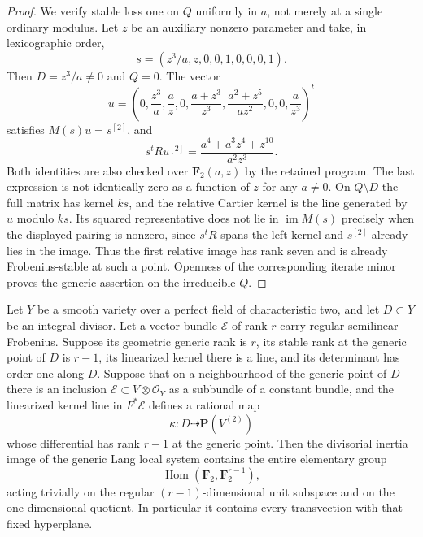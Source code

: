 \begin{proof}
We verify stable loss one on $Q$ uniformly in $a$, not merely at a
single ordinary modulus. Let $z$ be an auxiliary nonzero parameter
and take, in lexicographic order,
\[
             s=(z^3/a,z,0,0,1,0,0,0,1).
\]
Then $D=z^3/a\ne0$ and $Q=0$. The vector
\[
 u=\left(0,\frac{z^3}{a},\frac a z,0,
          \frac{a+z^3}{z^3},\frac{a^2+z^5}{az^2},0,0,\frac a{z^3}\right)^t
\]
satisfies $M(s)u=s^{[2]}$, and
\[
             s^tR u^{[2]}=\frac{a^4+a^3z^4+z^{10}}{a^2z^3}.
\]
Both identities are also checked over $\mathbf F_2(a,z)$ by the
retained program. The last expression is not identically zero as
a function of $z$ for any $a\ne0$.
On $Q\setminus D$ the full matrix has kernel $ks$, and the
relative Cartier kernel is the line generated by $u$ modulo $ks$.
Its squared representative does not lie in $\operatorname{im}M(s)$
precisely when the displayed pairing is nonzero, since $s^tR$
spans the left kernel and $s^{[2]}$ already lies in the image.
Thus the first relative image has rank seven and is already
Frobenius-stable at such a point. Openness of the corresponding
iterate minor proves the generic assertion on the irreducible $Q$.
\end{proof}

\begin{lemma}
\label{lem:moving-kernel-full-root-inertia-candidate}
Let $Y$ be a smooth variety over a perfect field of characteristic two,
and let $D\subset Y$ be an integral divisor. Let a vector bundle
$\mathcal E$ of rank $r$ carry regular semilinear Frobenius. Suppose
its geometric generic rank is $r$, its stable rank at the generic point
of $D$ is $r-1$, its linearized kernel there is a line, and its
determinant has order one along $D$.
Suppose that on a neighbourhood of the generic point of $D$ there is
an inclusion $\mathcal E\subset V\otimes\mathcal O_Y$ as a subbundle of a constant
bundle, and the linearized kernel line in $F^*\mathcal E$ defines
a rational map
\[
                      \kappa:D\dashrightarrow\mathbf P(V^{(2)})
\]
whose differential has rank $r-1$ at the generic point.
Then the divisorial inertia image of the generic Lang local system
contains the entire elementary group
\[
           \operatorname{Hom}(\mathbf F_2,\mathbf F_2^{r-1}),
\]
acting trivially on the regular $(r-1)$-dimensional unit subspace
and on the one-dimensional quotient. In particular it contains
every transvection with that fixed hyperplane.
\end{lemma}

